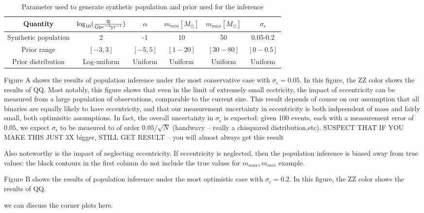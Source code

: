 \documentclass[twocolumn,prd,nofootinbib]{revtex4}
\begin{document}
\begin{table}
    \centering
    \begin{tabular}{c|ccccc}
        \hline \hline
       Quantity & $\log_{10}(\frac{\mathcal{R}}{\rm Gpc^{-3}yr^{-1}})$ & $\alpha$ & $m_{min} [M_\odot] $ & $m_{max} [M_\odot]$ & $\sigma_\epsilon$ \\ \hline
      Synthetic population & 2 & -1 & 10 & 50 & 0.05-0.2 \\ \hline
      Prior range & $[-3,3]$ & $[-5,5]$ & $[1-20]$ & $[30-80]$ & $[0-0.5]$ \\ \hline
      Prior distribution & Log-uniform & Uniform & Uniform & Uniform & Uniform  \\ \hline \hline
    \end{tabular}
    \caption{Parameter used to generate synthetic population and prior used for the inference}
    \label{tab:prior}
\end{table}


Figure A shows the results of population inference under the most conservative case with $\sigma_\epsilon=0.05$.  In this figure, the ZZ color shows the results of QQ.
%
Most notably, this figure shows that even in the limit of extremely small ecctricity, the impact of eccentricity can be measured from a large population of observations, comparable to the current size.  This result depends of course on our assumption that all binaries are equally likely to have eccentricity, and that our measurement uncertainty in eccentricity is both indpeendent of mass and fairly small, both optimisitic assumptions.  In fact, the overall uncertainty in $\sigma_\epsilon$ is expected: given 100 events, each with a measurement error of $0.05$, we expect $\sigma_\epsilon$ to be measured to of order $0.05/\sqrt{N}$ (handwavy -- really a chisquared distribution,etc).
SUSPECT THAT IF YOU MAKE THIS JUST 3X bigger, STILL GET RESULT -- you will almost always get this result

Also noteworthy is the impact of neglecting eccentricity.  If eccentricity is neglected, then the population inference is biased away from true values: the black contours in the first column do not include the true values for $m_{max}, m_{min}$ example.



Figure B shows the results of population inference under the most optimistic case with $\sigma_\epsilon=0.2$.  In this figure, the ZZ color shows the results of QQ.


we can discuss the corner plots here.
\end{document}

